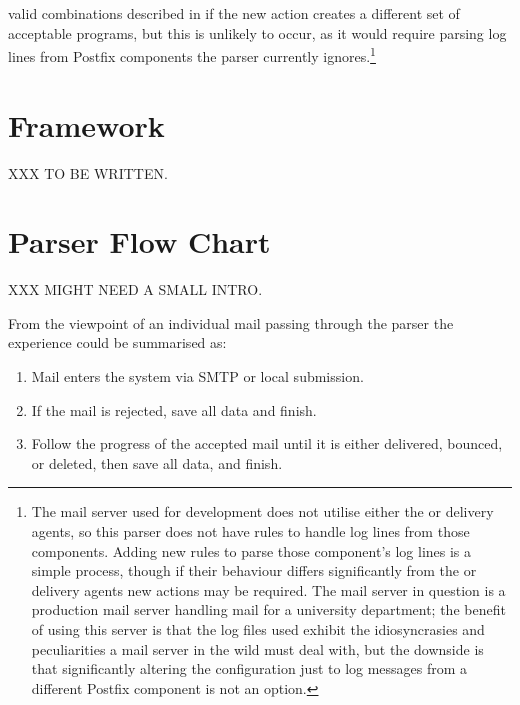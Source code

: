 valid combinations described in  if the
new action creates a different set of acceptable programs, but this is
unlikely to occur, as it would require parsing log lines from Postfix
components the parser currently ignores.\footnote{The mail server used for
development does not utilise either the  or 
delivery agents, so this parser does not have rules to handle log lines
from those components.  Adding new rules to parse those component's log
lines is a simple process, though if their behaviour differs significantly
from the  or  delivery agents new actions may be
required.  The mail server in question is a production mail server handling
mail for a university department; the benefit of using this server is that
the log files used exhibit the idiosyncrasies and peculiarities a mail
server in the wild must deal with, but the downside is that significantly
altering the configuration just to log messages from a different Postfix
component is not an option.}


\section{Framework}

XXX TO BE WRITTEN\@.


\section{Parser Flow Chart}

\label{flow-chart}

XXX MIGHT NEED A SMALL INTRO\@.

From the viewpoint of an individual mail passing through the parser the
experience could be summarised as:

\begin{enumerate}

    \item Mail enters the system via \gls{SMTP} or local submission.

    \item If the mail is rejected, save all data and finish.

    \item Follow the progress of the accepted mail until it is either
        delivered, bounced, or deleted, then save all data, and finish.

\end{enumerate}

